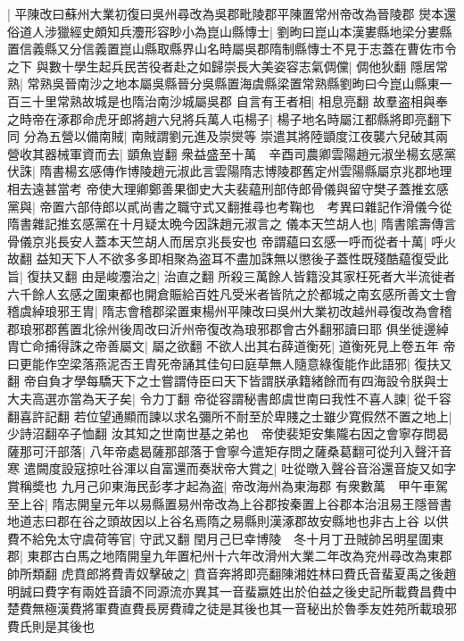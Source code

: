 |{
	平陳改曰蘇州大業初復曰吳州尋改為吳郡毗陵郡平陳置常州帝改為晉陵郡}
爕本還俗道人涉獵經史頗知兵灋形容眇小為崑山縣慱士|{
	劉昫曰崑山本漢婁縣地梁分婁縣置信義縣又分信義置崑山縣取縣界山名時屬吳郡隋制縣慱士不見于志蓋在曹佐市令之下}
與數十學生起兵民苦役者赴之如歸崇長大美姿容志氣倜儻|{
	倜他狄翻}
隱居常熟|{
	常熟吳晉南沙之地本屬吳縣晉分吳縣置海虞縣梁置常熟縣劉昫曰今崑山縣東一百三十里常熟故城是也隋治南沙城屬吳郡}
自言有王者相|{
	相息亮翻}
故羣盗相與奉之時帝在涿郡命虎牙郎將趙六兒將兵萬人屯楊子|{
	楊子地名時屬江都縣將即亮翻下同}
分為五營以備南賊|{
	南賊謂劉元進及崇爕等}
崇遣其將陸顗度江夜襲六兒破其兩營收其器械軍資而去|{
	顗魚豈翻}
衆益盛至十萬　辛酉司農卿雲陽趙元淑坐楊玄感黨伏誅|{
	隋書楊玄感傳作博陵趙元淑此言雲陽隋志博陵郡舊定州雲陽縣屬京兆郡地理相去遠甚當考}
帝使大理卿鄭善果御史大夫裴藴刑部侍郎骨儀與留守樊子蓋推玄感黨與|{
	帝置六部侍郎以貳尚書之職守式又翻推尋也考鞠也　考異曰雜記作滑儀今從隋書雜記推玄感黨在十月疑太晩今因誅趙元淑言之}
儀本天竺胡人也|{
	隋書隂壽傳言骨儀京兆長安人蓋本天竺胡人而居京兆長安也}
帝謂藴曰玄感一呼而從者十萬|{
	呼火故翻}
益知天下人不欲多多即相聚為盗耳不盡加誅無以懲後子蓋性既殘酷藴復受此旨|{
	復扶又翻}
由是峻灋治之|{
	治直之翻}
所殺三萬餘人皆籍没其家枉死者大半流徙者六千餘人玄感之圍東都也開倉賑給百姓凡受米者皆阬之於都城之南玄感所善文士會稽虞綽琅邪王胄|{
	隋志會稽郡梁置東楊州平陳改曰吳州大業初改越州尋復改為會稽郡琅邪郡舊置北徐州後周改曰沂州帝復改為琅邪郡會古外翻邪讀曰耶}
俱坐徙邊綽胄亡命捕得誅之帝善屬文|{
	屬之欲翻}
不欲人出其右薛道衡死|{
	道衡死見上卷五年}
帝曰更能作空梁落燕泥否王胄死帝誦其佳句曰庭草無人隨意綠復能作此語邪|{
	復扶又翻}
帝自負才學每驕天下之士嘗謂侍臣曰天下皆謂朕承籍緒餘而有四海設令朕與士大夫高選亦當為天子矣|{
	令力丁翻}
帝從容謂秘書郎虞世南曰我性不喜人諫|{
	從千容翻喜許記翻}
若位望通顯而諫以求名彌所不耐至於卑賤之士雖少寛假然不置之地上|{
	少詩沼翻卒子恤翻}
汝其知之世南世基之弟也　帝使裴矩安集隴右因之會寧存問曷薩那可汗部落|{
	八年帝處曷薩那部落于會寧今遣矩存問之薩桑葛翻可從刋入聲汗音寒}
遣闕度設寇掠吐谷渾以自富還而奏狀帝大賞之|{
	吐從暾入聲谷音浴還音旋又如字賞稱奬也}
九月己卯東海民彭孝才起為盗|{
	帝改海州為東海郡}
有衆數萬　甲午車駕至上谷|{
	隋志開皇元年以易縣置易州帝改為上谷郡按秦置上谷郡本治沮易王隱晉書地道志曰郡在谷之頭故因以上谷名焉隋之易縣則漢涿郡故安縣地也非古上谷}
以供費不給免太守虞荷等官|{
	守武又翻}
閏月己巳幸博陵　冬十月丁丑賊帥呂明星圍東郡|{
	東郡古白馬之地隋開皇九年置杞州十六年改滑州大業二年改為兖州尋改為東郡帥所類翻}
虎賁郎將費青奴擊破之|{
	賁音奔將即亮翻陳湘姓林曰費氏音蜚夏禹之後趙明誠曰費字有兩姓音讀不同源流亦異其一音蜚嬴姓出於伯益之後史記所載費昌費中楚費無極漢費將軍費直費長房費禕之徒是其後也其一音秘出於魯季友姓苑所載琅邪費氏則是其後也}
